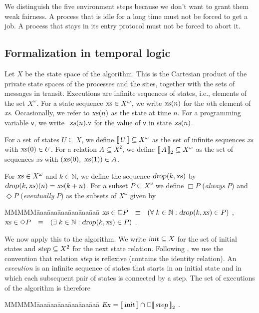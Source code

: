 \documentclass[10pt]{article} \usepackage[english]{babel}
\newenvironment{tab}{\begin{tabbing}
MMMMM\=aaa\=aaa\=aaa\=aaa\=aaa\=aaa\= \kill}{\end{tabbing}}
\def\sem #1{\hbox{$[\![\, #1\, ]\!] $}}
\def\Nat   {\mbox{$\mathbb{N}$}}
\def\all   {\forall\;}
\def\ex    {\exists\;}
\def\S #1/{\mbox {\textsl{#1}}}
\def\T #1/{\mbox {\texttt{#1}}}
\def\EQ     {\mbox{\quad$\equiv$\quad}}
\begin{document}
We distinguish the five environment steps because we don't want to
grant them weak fairness.  A process that is idle for a long time must
not be forced to get a job.  A process that stays in its entry
protocol must not be forced to abort it.

\subsection{Formalization in temporal logic} \label{execform}

Let $X$ be the state space of the algorithm.  This is the Cartesian
product of the private state spaces of the processes and the sites,
together with the sets of messages in transit.  Executions are
infinite sequences of states, i.e., elements of the set $X^\omega$.
For a state sequence $\S xs/\in X^\omega$, we write $\S xs/(n)$ for
the $n$th element of \S xs/.  Occasionally, we refer to $\S xs/(n)$ as
the state at time $n$. For a programming variable \T v/, we write $\S
xs/(n).\T v/$ for the value of \T v/ in state $\S xs/(n)$.

For a set of states $U\subseteq X$, we define $\sem{U}\subseteq
X^\omega $ as the set of infinite sequences \S xs/ with $\S xs/(0)\in
U$. For a relation $A\subseteq X^2$, we define $\sem{A}_2\subseteq
X^\omega$ as the set of sequences \S xs/ with $(\S xs/(0),\S
xs/(1))\in A$.

For $\S xs/\in X^\omega$ and $k\in \Nat$, we define the sequence $\S drop/(k, \S xs/)$ by $\S drop/(k, \S xs/)(n) = \S xs/(k+n)$.  For a
subset $P\subseteq X^\omega$ we define $\Box P$ (\emph{always} $P$)
and $\Diamond P$ (\emph{eventually} $P$) as the subsets of $X^\omega$
given by
\begin{tab}
\> $\S xs/\in \Box P \EQ (\all k\in\Nat: \S drop/(k, \S xs/)\in P) $  ,\\
\> $\S xs/\in \Diamond P \EQ (\ex k\in\Nat: \S drop/(k, \S xs/)\in P) $  .
\end{tab}

We now apply this to the algorithm.  We write $\S init/\subseteq X$
for the set of initial states and $\S step/\subseteq X^2$ for the next
state relation. Following \cite{AbL91}, we use the convention that
relation \S step/ is reflexive (contains the identity relation).  An
\emph{execution} is an infinite sequence of states that starts in an
initial state and in which each subsequent pair of states is connected
by a step. The set of executions of the algorithm is therefore
\begin{tab}
\> $ \S Ex/ = \sem{\S init/}\cap \Box\sem{\S step/}_2$ .
\end{tab}
\end{document}
